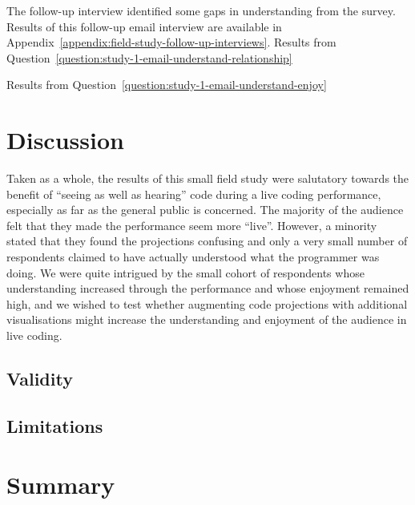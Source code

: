 The follow-up interview identified some gaps in understanding from the survey.  
Results of this follow-up email interview are available in Appendix~\ref{appendix:field-study-follow-up-interviews}. 
Results from Question~\ref{question:study-1-email-understand-relationship}

Results from Question~\ref{question:study-1-email-understand-enjoy}

\section{Discussion}

Taken as a whole, the results of this small field study were salutatory towards the benefit of ``seeing as well as hearing'' code during a live coding performance, especially as far as the general public is concerned. The majority of the audience felt that they made the performance seem more ``live''. However, a minority stated that they found the projections confusing and only a very small number of respondents claimed to have actually understood what the programmer was doing. We were quite intrigued by the small cohort of respondents whose understanding increased through the performance and whose enjoyment remained high, and we wished to test whether augmenting code projections with additional visualisations might increase the understanding and enjoyment of the audience in live coding. 

\subsection{Validity}



\subsection{Limitations}



\section{Summary}




